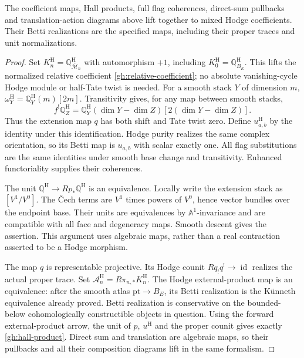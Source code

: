 \begin{lemma}\label{gh:hodge-lift}
The coefficient maps, Hall products, full flag coherences, direct-sum
pullbacks and translation-action diagrams above lift together to
mixed Hodge coefficients. Their Betti realizations are the specified
maps, including their proper traces and unit normalizations.
\end{lemma}
\begin{proof}
Set $K_n^{\mathrm H}=\mathbb Q^{\mathrm H}_{\overline{\mathcal M}_n}$
with automorphism $+1$, including $K_0^{\mathrm H}=\mathbb Q^{\mathrm H}_{B_E}$.
This lifts the normalized relative coefficient
\eqref{gh:relative-coefficient}; no absolute vanishing-cycle Hodge
module or half-Tate twist is needed.
For a smooth stack $Y$ of dimension $m$,
$\omega_Y^{\mathrm H}=\mathbb Q_Y^{\mathrm H}(m)[2m]$.
Transitivity gives, for any map between smooth stacks,
\[
 f^!\mathbb Q_Z^{\mathrm H}
 =\mathbb Q_Y^{\mathrm H}(\dim Y-\dim Z)
                                      [2(\dim Y-\dim Z)].
\]
Thus the extension map $q$ has both shift and Tate twist zero.
Define $u_{a,b}^{\mathrm H}$ by the identity under this
identification. Hodge purity realizes the same complex orientation,
so its Betti map is $u_{a,b}$ with scalar exactly one.
All flag substitutions are the same identities under smooth base
change and transitivity. Enhanced functoriality supplies their
coherences.

The unit $\mathbb Q^{\mathrm H}\to Rp_*\mathbb Q^{\mathrm H}$
is an equivalence. Locally write the extension stack as $[V^1/V^0]$.
The \v Cech terms are $V^1$ times powers of $V^0$, hence vector
bundles over the endpoint base. Their units are equivalences by
$\mathbb A^1$-invariance and are compatible with all face and
degeneracy maps. Smooth descent gives the assertion. This argument
uses algebraic maps, rather than a real contraction asserted to be a
Hodge morphism.

The map $q$ is representable projective. Its Hodge counit
$Rq_!q^!\to\operatorname{id}$ realizes the actual proper trace.
Set $\mathcal A_n^{\mathrm H}=R\pi_{n,*}K_n^{\mathrm H}$.
The Hodge external-product map is an equivalence: after the smooth
atlas $\mathrm{pt}\to B_E$, its Betti realization is the K\"unneth
equivalence already proved. Betti realization is conservative on
the bounded-below cohomologically constructible objects in question.
Using the forward external-product arrow, the unit of $p$, $u^{\mathrm H}$
and the proper counit gives exactly \eqref{gh:hall-product}.
Direct sum and translation are algebraic maps, so their pullbacks
and all their composition diagrams lift in the same formalism.
\end{proof}

